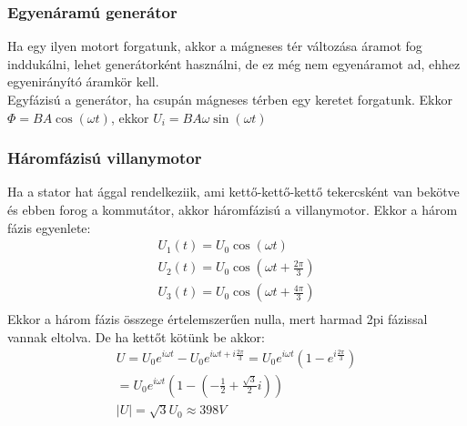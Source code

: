 \documentclass{article}
\begin{document}
\subsubsection{Egyenáramú generátor}
Ha egy ilyen motort forgatunk, akkor a mágneses tér változása áramot fog inddukálni, lehet generátorként használni, de ez még nem egyenáramot ad, ehhez egyenirányító áramkör kell. \\
Egyfázisú a generátor, ha csupán mágneses térben egy keretet forgatunk. Ekkor $\Phi = BA \cos(\omega t)$, ekkor $U_i = BA\omega \sin(\omega t) $ 
\subsubsection{Háromfázisú villanymotor}
Ha a stator hat ággal rendelkeziik, ami kettő-kettő-kettő tekercsként van bekötve és ebben forog a kommutátor, akkor háromfázisú a villanymotor. Ekkor a három fázis egyenlete: 
\begin{gather*}
U_1(t) = U_0 \cos(\omega t)\\
U_2 (t) = U_0 \cos(\omega t + \frac{2\pi}{3}) \\
U_3 (t) = U_0 \cos(\omega t + \frac{4\pi}{3}) \\
\end{gather*} 
Ekkor a három fázis összege értelemszerűen nulla, mert harmad 2pi fázissal vannak eltolva. De ha kettőt kötünk be akkor:
\begin{gather*}
U = U_0 e^{i\omega t } - U_0 e^{i\omega t + i\frac{2\pi}{3}} = U_0 e^{i\omega t} (1-e^{i \frac{2\pi}{3}}) \\
= U_0 e^{i\omega t} \left(1-\left(-\frac{1}{2} + \frac{\sqrt{3}}{2}i \right)\right) \\
|U| = \sqrt{3} U_0 \approx 398 V
\end{gather*}
\end{document}
